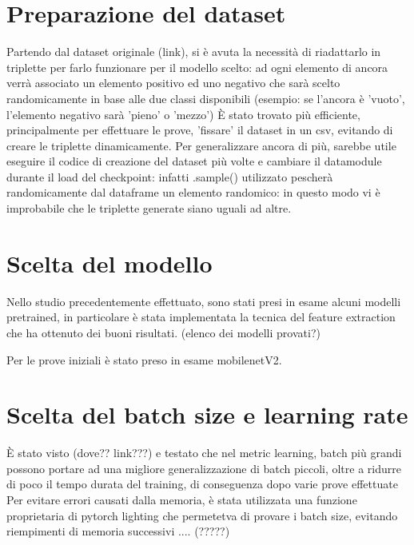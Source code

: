 \documentclass[11pt]{article}
\begin{document}

\section{Preparazione del dataset}

Partendo dal dataset originale (link), si è avuta la necessità di riadattarlo in triplette per farlo funzionare per il modello scelto: ad ogni elemento di ancora verrà associato un elemento positivo ed uno negativo che sarà scelto randomicamente in base alle due classi disponibili (esempio: se l'ancora è 'vuoto', l'elemento negativo sarà 'pieno' o 'mezzo')
È stato trovato più efficiente, principalmente per effettuare le prove, 'fissare' il dataset in un csv, evitando di creare le triplette dinamicamente. Per generalizzare ancora di più, sarebbe utile eseguire il codice di creazione del dataset più volte e cambiare il datamodule durante il load del checkpoint: infatti .sample() utilizzato pescherà randomicamente dal dataframe un elemento randomico: in questo modo vi è improbabile che le triplette generate siano uguali ad altre.

\section{Scelta del modello}

Nello studio precedentemente effettuato, sono stati presi in esame alcuni modelli pretrained, in particolare è stata implementata la tecnica del feature extraction che ha ottenuto dei buoni risultati. (elenco dei modelli provati?)


Per le prove iniziali è stato preso in esame mobilenetV2.

\section{Scelta del batch size e learning rate}

È stato visto (dove?? link???) e testato che nel metric learning, batch più grandi possono portare ad una migliore generalizzazione di batch piccoli, oltre a ridurre di poco il tempo durata del training, di conseguenza dopo varie prove effettuate
Per evitare errori causati dalla memoria, è stata utilizzata una funzione proprietaria di pytorch lighting che permetetva di provare i batch size, evitando riempimenti di memoria successivi .... (?????)
\end{document}
